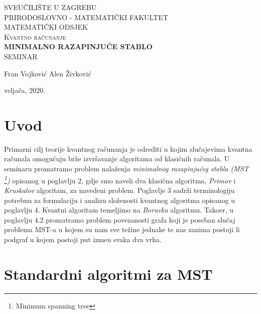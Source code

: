 \documentclass[a4paper,12pt]{article}
\begin{document}
\begin{titlepage}
\begin{center}

\textsc{\large {SVEU\v{C}ILI\v{S}TE U ZAGREBU\\ PRIRODOSLOVNO - MATEMATI\v{C}KI FAKULTET\\  MATEMATI\v{C}KI ODSJEK}}\\[6.0cm]


\textsc{\Large {Kvantno ra\v{c}unanje}}\\[0.5cm]
\textsc{\huge\bfseries \Large MINIMALNO RAZAPINJU\'CE STABLO} \\[1.0cm]
\textsc{\Large {SEMINAR}}\\[0.5cm]

\vfill


\noindent
\begin{minipage}[t]{25cm}
\large{Fran Vojkovi\'c}\newline
\large{Alen \v{Z}ivkovi\'c}\newline
\end{minipage}

\large{velja\v{c}a, 2020.}
\end{center}
\end{titlepage}

\newpage
\tableofcontents
\newpage

\section{Uvod}

Primarni cilj teorije kvantnog ra\v{c}unanja je odrediti u kojim slu\v{c}ajevima kvantna ra\v{c}unala omogu\'cuju br\v{z}e izvr\v{s}avanje algoritama od klasi\v{c}nih ra\v{c}unala. U seminaru promatramo problem nala\v{z}enja \emph{minimalnog razapinju\'ceg stabla (MST \footnote{Minimum spanning tree})} opisanog u poglavlju 2, gdje smo naveli dva klasi\v{c}na algoritma, \emph{Primov} i \emph{Kruskalov} algoritam, za navedeni problem. Poglavlje 3 sadr\v{z}i terminologiju potrebnu za formulaciju i analizu slo\v{z}enosti kvantnog algoritma opisanog u poglavlju 4. Kvantni algoritam temeljimo na \emph{Boruvka} algoritmu. Tako\dj{}er, u poglavlju 4.2 promatramo problem povezanosti grafa koji je poseban slu\v{c}aj problema MST-a u kojem su nam sve te\v{z}ine jednake te nas zanima postoji li podgraf u kojem postoji put izme\dj{}u svaka dva vrha.  

\newpage

\section{Standardni algoritmi za MST}
\end{document}
